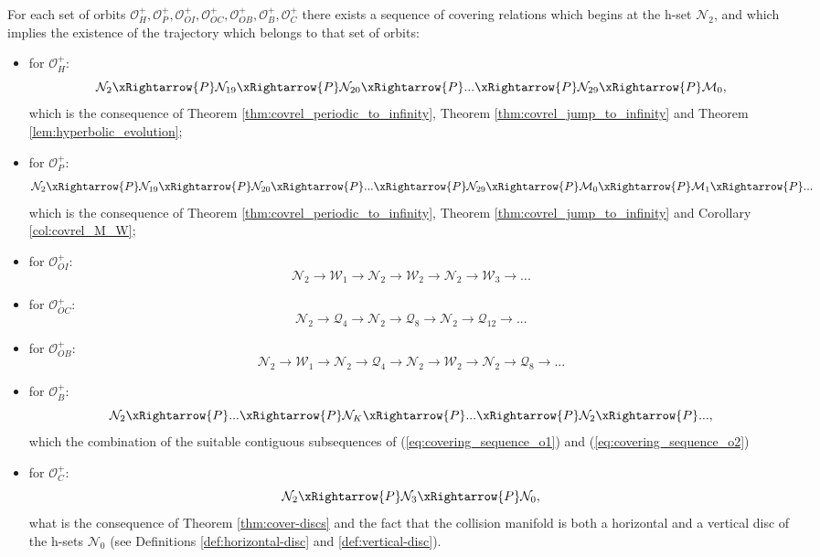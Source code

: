 \documentclass[1p]{article}
\begin{document}
For each set of orbits $\mathcal{O}^+_H, \mathcal{O}^+_P, \mathcal{O}^+_{OI}, \mathcal{O}^+_{OC}, \mathcal{O}^+_{OB}, \mathcal{O}^+_B, \mathcal{O}^+_C$ there exists a sequence of covering relations which begins at the h-set $\mathcal{N}_2$, and which implies the existence of the trajectory which belongs to that set of orbits:
\begin{itemize}
    \item for $\mathcal{O}_H^+$:
    \[
        \mathcal{N}_2 \xRightarrow{P} \mathcal{N}_{19} \xRightarrow{P} \mathcal{N}_{20} \xRightarrow{P} ... \xRightarrow{P} \mathcal{N}_{29} \xRightarrow{P}
        \mathcal{M}_0,
    \]
    which is the consequence of Theorem \ref{thm:covrel_periodic_to_infinity}, Theorem \ref{thm:covrel_jump_to_infinity} and Theorem \ref{lem:hyperbolic_evolution};
    \item for $\mathcal{O}_P^+$:
    \[
        \mathcal{N}_2 \xRightarrow{P} \mathcal{N}_{19} \xRightarrow{P} \mathcal{N}_{20} \xRightarrow{P} ... \xRightarrow{P} \mathcal{N}_{29} \xRightarrow{P}
        \mathcal{M}_0 \xRightarrow{P} \mathcal{M}_1 \xRightarrow{P} ...
    \]
    which is the consequence of Theorem \ref{thm:covrel_periodic_to_infinity}, Theorem \ref{thm:covrel_jump_to_infinity} and Corollary \ref{col:covrel_M_W};
    \item for $\mathcal{O}_{OI}^+$:
    \[
        \mathcal{N}_2 \rightarrow \mathcal{W}_1 \rightarrow \mathcal{N}_2 \rightarrow \mathcal{W}_2 \rightarrow \mathcal{N}_2 \rightarrow \mathcal{W}_3 \rightarrow ...
    \]
    \item for $\mathcal{O}_{OC}^+$:
    \[
        \mathcal{N}_2 \rightarrow \mathcal{Q}_4 \rightarrow \mathcal{N}_2 \rightarrow \mathcal{Q}_8 \rightarrow \mathcal{N}_2 \rightarrow \mathcal{Q}_{12} \rightarrow ...
    \]
    \item for $\mathcal{O}_{OB}^+$:
    \[
        \mathcal{N}_2 \rightarrow \mathcal{W}_1 \rightarrow \mathcal{N}_2 \rightarrow \mathcal{Q}_4 \rightarrow \mathcal{N}_2 \rightarrow \mathcal{W}_2 \rightarrow \mathcal{N}_2 \rightarrow \mathcal{Q}_8 \rightarrow ...
    \]
    \item for $\mathcal{O}_B^+$:
    \[
        \mathcal{N}_2 \xRightarrow{P} ... \xRightarrow{P} \mathcal{N}_K \xRightarrow{P} ... \xRightarrow{P} \mathcal{N}_2 \xRightarrow{P} ... ,
    \]
    which the combination of the suitable contiguous subsequences of (\ref{eq:covering_sequence_o1}) and (\ref{eq:covering_sequence_o2})
    \item for $\mathcal{O}_C^+$:
    \[
        \mathcal{N}_2 \xRightarrow{P} \mathcal{N}_3 \xRightarrow{P} \mathcal{N}_0,
    \]
    what is the consequence of Theorem \ref{thm:cover-discs} and the fact that the collision manifold is both a horizontal and a vertical disc of the h-sets $\mathcal{N}_0$ (see Definitions \ref{def:horizontal-disc} and \ref{def:vertical-disc}).
\end{itemize}
\end{document}

